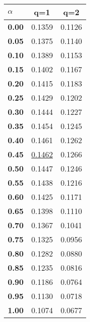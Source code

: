 \begin{tabular}{ | l || c | c |}
\hline
\textbf{$\alpha$} & \textbf{}q=1} & \textbf{}q=2} \\
\hline
\textbf{0.00} & 0.1359 & 0.1126\\
\hline
\textbf{0.05} & 0.1375 & 0.1140\\
\hline
\textbf{0.10} & 0.1389 & 0.1153\\
\hline
\textbf{0.15} & 0.1402 & 0.1167\\
\hline
\textbf{0.20} & 0.1415 & 0.1183\\
\hline
\textbf{0.25} & 0.1429 & 0.1202\\
\hline
\textbf{0.30} & 0.1444 & 0.1227\\
\hline
\textbf{0.35} & 0.1454 & 0.1245\\
\hline
\textbf{0.40} & 0.1461 & 0.1262\\
\hline
\textbf{0.45} & \underline{0.1462} & 0.1266\\
\hline
\textbf{0.50} & 0.1447 & 0.1246\\
\hline
\textbf{0.55} & 0.1438 & 0.1216\\
\hline
\textbf{0.60} & 0.1425 & 0.1171\\
\hline
\textbf{0.65} & 0.1398 & 0.1110\\
\hline
\textbf{0.70} & 0.1367 & 0.1041\\
\hline
\textbf{0.75} & 0.1325 & 0.0956\\
\hline
\textbf{0.80} & 0.1282 & 0.0880\\
\hline
\textbf{0.85} & 0.1235 & 0.0816\\
\hline
\textbf{0.90} & 0.1186 & 0.0764\\
\hline
\textbf{0.95} & 0.1130 & 0.0718\\
\hline
\textbf{1.00} & 0.1074 & 0.0677\\
\hline
\end{tabular}
